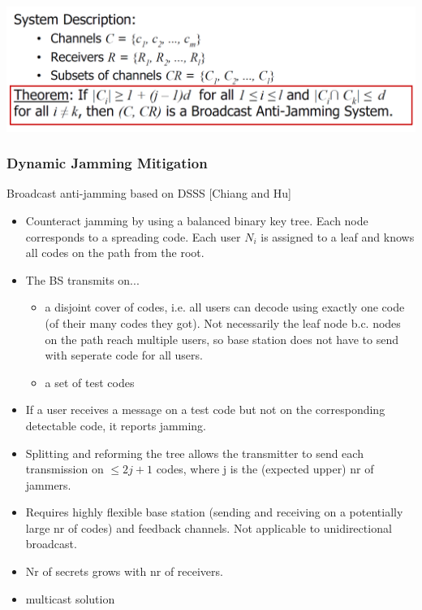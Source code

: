 \begin{minipage}{\linewidth}
    \centering      
    \includegraphics[width=\linewidth]{Figures/L3_Theorem.PNG} 
\end{minipage}

\subsubsection{Dynamic Jamming Mitigation}
Broadcast anti-jamming based on DSSS [Chiang and Hu]
\begin{itemize}
    \item Counteract jamming by using a balanced binary key tree. Each node corresponds to a spreading code. Each user $N_i$ is assigned to a leaf and knows all codes on the path from the root.
    \item The BS transmits on... 
    \begin{itemize}
        \item a disjoint cover of codes, i.e. all users can decode using exactly one code (of their many codes they got). Not necessarily the leaf node b.c. nodes on the path reach multiple users, so base station does not have to send with seperate code for all users.
        \item a set of test codes 
    \end{itemize}
    \item If a user receives a message on a test code but not on the corresponding detectable code, it reports jamming.
    \item Splitting and reforming the tree allows the transmitter to send each transmission on $\leq 2j + 1$ codes, where j is the (expected upper) nr of jammers.
    \item Requires highly flexible base station (sending and receiving on a potentially large nr of codes) and feedback channels. Not applicable to unidirectional broadcast.
    \item Nr of secrets grows with nr of receivers.
    \item multicast solution 
\end{itemize}

